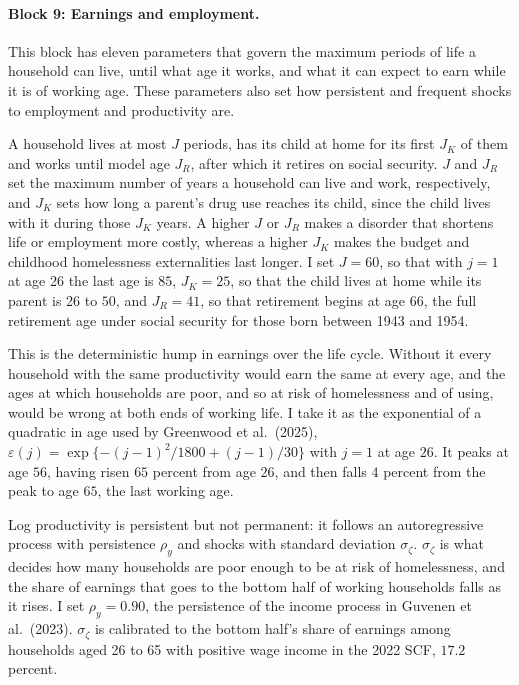 \documentclass[10pt]{article}
\begin{document}
\paragraph{Block 9: Earnings and employment.}   This block has eleven parameters that govern the maximum periods of life a household can live, until what age it works, and what it can expect to earn while it is of working age. These parameters also set how persistent and frequent shocks to employment and productivity are.
\begin{description}\setlength{\itemsep}{0.25em}\setlength{\parskip}{0em}
\item[$J$, $J_K$ and $J_R$, the length of life, of child rearing and of working life, respectively.] A household lives at most
$J$ periods, has its child at home for its first $J_K$ of them and works until model age $J_R$, after which it retires on social security.
  $J$ and $J_R$ set the maximum number of years a household can live and work, respectively, and $J_K$ sets how long a parent's drug use reaches its child, since the child lives with it during those $J_K$ years. A higher $J$ or $J_R$ makes a disorder that shortens life or employment more costly, whereas a higher $J_K$ makes the budget and childhood homelessness externalities last longer. I set $J=60$, so
that with $j=1$ at age 26 the last age is $85$, $J_K=25$, so that the child lives at home while its parent is 26 to $50$, and $J_R=41$, so that retirement begins at age $66$, the
full retirement age under social security for those born between 1943 and 1954.
\item[$\varepsilon(j)$, the age profile of efficiency.] This is the deterministic hump in
earnings over the life cycle. Without it every
household with the same productivity would earn the same at every age, and the ages at which households are
poor, and so at risk of homelessness and of using, would be wrong at both ends of
working life. I take it as the exponential of a quadratic in age used by
Greenwood et al.\ (2025), $\varepsilon(j)=\exp\{-(j-1)^2/1800+(j-1)/30\}$ with $j=1$
at age $26$. It peaks at age $56$, having risen $65$ percent from age $26$, and then
falls $4$ percent from the peak to age $65$, the last working age.

\item[$\rho_y$ and $\sigma_\zeta$, the productivity process.] Log
productivity is persistent but not permanent: it follows an autoregressive process
with persistence $\rho_y$ and shocks with standard deviation
$\sigma_\zeta$. $\sigma_\zeta$ is what decides how many households are poor
enough to be at risk of homelessness, and the share of earnings
that goes to the bottom half of working households falls as it rises. I set
$\rho_y=0.90$, the persistence of the income process in Guvenen et al.\ (2023). $\sigma_\zeta$
is calibrated to the bottom half's share of earnings among households aged 26 to 65 with
positive wage income in the 2022 SCF, $17.2$ percent.


\end{description}
\end{document}
